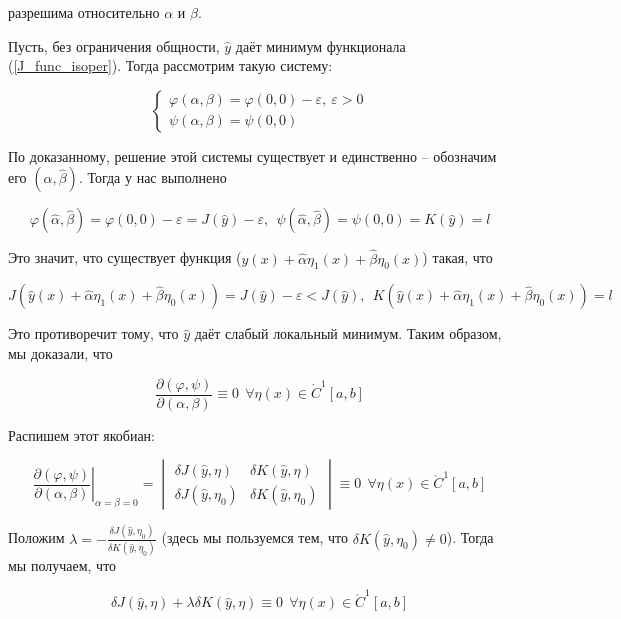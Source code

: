 разрешима относительно $\alpha$ и $\beta$.

Пусть, без ограничения общности, $\widehat{y}$ даёт минимум
функционала (\ref{J_func_isoper}). Тогда рассмотрим такую систему:

\begin{equation*}
\begin{cases}
\varphi(\alpha, \beta) = \varphi(0, 0) - \varepsilon,\  \varepsilon > 0 \\
\psi(\alpha, \beta) = \psi(0, 0)
\end{cases}
\end{equation*}

По доказанному, решение этой системы существует и единственно --
обозначим его $(\widehat{\alpha}, \widehat{\beta})$. Тогда у нас выполнено

$$
\varphi(\widehat{\alpha}, \widehat{\beta}) = \varphi(0, 0) - \varepsilon = 
J(\widehat{y}) - \varepsilon, \ \ 
\psi(\widehat{\alpha}, \widehat{\beta}) = \psi(0, 0) = 
K(\widehat{y}) = l
$$

Это значит, что существует функция 
($\widehat{y}(x) + \widehat{\alpha} \eta_1(x) + \widehat{\beta} \eta_0(x)$)
такая, что

$$
J(\widehat{y}(x) + \widehat{\alpha} \eta_1(x) + \widehat{\beta} \eta_0(x)) =
J(\widehat{y}) - \varepsilon < J(\widehat{y}), \ \ 
K(\widehat{y}(x) + \widehat{\alpha} \eta_1(x) + \widehat{\beta} \eta_0(x)) =
l
$$

Это противоречит тому, что $\widehat{y}$ даёт слабый локальный минимум.
Таким образом, мы доказали, что 

$$
\frac{\partial (\varphi, \psi)}{\partial (\alpha, \beta)} \equiv 0
\ \ \forall \eta(x) \in \mathring{C}^1 [a, b]
$$

Распишем этот якобиан:

$$
\left. \frac{\partial (\varphi, \psi)}{\partial (\alpha, \beta)}
\right|_{\alpha = \beta = 0} = 
\begin{vmatrix}
\delta J(\widehat{y}, \eta) & \delta K(\widehat{y}, \eta) \\
\delta J(\widehat{y}, \eta_0) & \delta K(\widehat{y}, \eta_0)
\end{vmatrix}
\equiv 0 \ \ \forall \eta(x) \in \mathring{C}^1 [a, b]
$$

Положим $\lambda = -\frac{\delta J(\widehat{y}, \eta_0)}
{\delta K(\widehat{y}, \eta_0)}$ (здесь мы пользуемся тем, что
$\delta K(\widehat{y}, \eta_0) \neq 0$). Тогда мы получаем, что


$$
\delta J(\widehat{y}, \eta) + \lambda
\delta K(\widehat{y}, \eta) \equiv 0\ \ 
\forall \eta(x) \in \mathring{C}^1 [a, b]
$$

